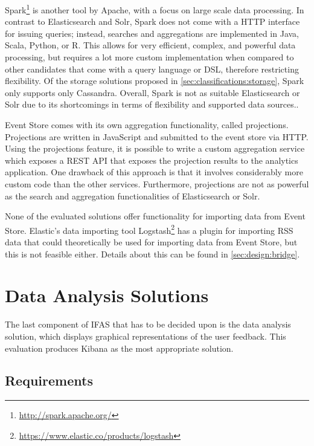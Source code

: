 Spark\footnote{\url{http://spark.apache.org/}} is another tool by Apache, with a focus on large scale data processing.
In contrast to Elasticsearch and Solr, Spark does not come with a HTTP interface for issuing queries; instead, searches and aggregations are implemented in Java, Scala, Python, or R.
This allows for very efficient, complex, and powerful data processing, but requires a lot more custom implementation when compared to other candidates that come with a query language or \ac{DSL}, therefore restricting flexibility.
Of the storage solutions proposed in \cref{sec:classifications:storage}, Spark only supports only Cassandra.
Overall, Spark is not as suitable Elasticsearch or Solr due to its shortcomings in terms of flexibility and supported data sources..

Event Store comes with its own aggregation functionality, called projections.
Projections are written in JavaScript and submitted to the event store via HTTP.
Using the projections feature, it is possible to write a custom aggregation service which exposes a \ac{REST} API that exposes the projection results to the analytics application.
One drawback of this approach is that it involves considerably more custom code than the other services.
Furthermore, projections are not as powerful as the search and aggregation functionalities of Elasticsearch or Solr.

None of the evaluated solutions offer functionality for importing data from Event Store.
Elastic's data importing tool Logstash\footnote{\url{https://www.elastic.co/products/logstash}} has a plugin for importing \ac{RSS} data that could theoretically be used for importing data from Event Store, but this is not feasible either.
Details about this can be found in \cref{sec:design:bridge}.

\section{Data Analysis Solutions}
\label{sec:classifications:analysis}

The last component of \ac{IFAS} that has to be decided upon is the data analysis solution, which displays graphical representations of the user feedback.
This evaluation produces Kibana as the most appropriate solution.

\subsection{Requirements}


